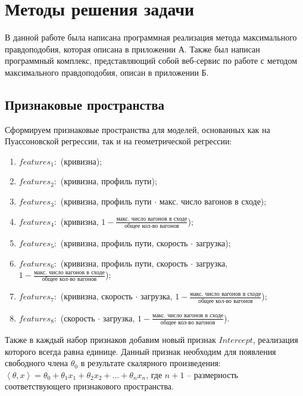 \section{Методы решения задачи}

В данной работе была написана программная реализация метода максимального правдоподобия, которая описана в приложении А. Также был написан программный комплекс, представляющий собой веб-сервис по работе с методом максимального правдоподобия, описан в приложении Б.


\subsection{Признаковые пространства}

Сформируем признаковые пространства для моделей, основанных как на Пуассоновской регрессии, так и на геометрической регрессии:

\begin{enumerate}[label=\arabic*.]
    \item $features_1:$ (кривизна);
    \item $features_2:$ (кривизна, профиль пути);
    \item $features_3:$ (кривизна, профиль пути $\cdot$ макс. число вагонов в сходе);
    \item $features_4:$ (кривизна, $1 - \frac{\text{макс. число вагонов в сходе}}{\text{общее кол-во вагонов}}$);
    \item $features_5:$ (кривизна, профиль пути, скорость $\cdot$ загрузка);
    \item $features_6:$ (кривизна, профиль пути, скорость $\cdot$ загрузка,\\ $1 - \frac{\text{макс. число вагонов в сходе}}{\text{общее кол-во вагонов}}$);
    \item $features_7:$ (кривизна, скорость $\cdot$ загрузка, $1 - \frac{\text{макс. число вагонов в сходе}}{\text{общее кол-во вагонов}}$);
    \item $features_8:$ (скорость $\cdot$ загрузка, $1 - \frac{\text{макс. число вагонов в сходе}}{\text{общее кол-во вагонов}}$).
    \newline
\end{enumerate}
Также в каждый набор признаков добавим новый признак $Intercept$, реализация которого всегда равна единице. Данный признак необходим для появления свободного члена $\theta_0$ в результате скалярного произведения: $\left\langle \theta, x\right\rangle = \theta_0 + \theta_1 x_1 + \theta_2 x_2 + \ldots + \theta_n x_n$, где $n+1$ -- размерность соответствующего признакового пространства.


